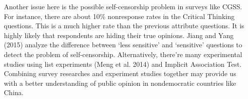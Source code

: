 \documentclass[12pt]{article}\usepackage[]{graphicx}\usepackage[]{color}
\begin{document}
Another issue here is the possible self-censorship problem in surveys like CGSS. For instance, there are about 10\% nonresponse rates in the Critical Thinking questions. This is a much higher rate than the previous attribute questions. It is highly likely that respondents are hiding their true opinions. Jiang and Yang (2015) analyze the difference between `less sensitive' and `sensitive' questions to detect the problem of self-censorship. Alternatively, there're many experimental studies using list experiments (Meng et al. 2014) and Implicit Association Test. Combining survey researches and experiment studies together may provide us with a better understanding of public opinion in nondemocratic countries like China.




\nocite{GeddesZaller1989}




\newpage

%
%

\end{document}
